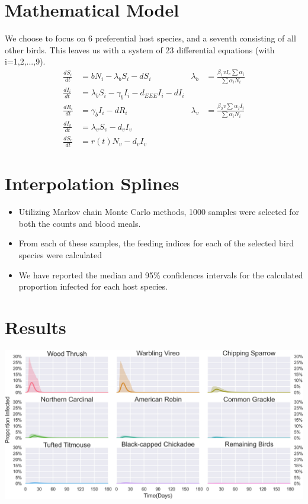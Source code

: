 \documentclass[portrait]{sciposter}
\begin{document}
\begin{multicols}{2}
 \section*{Mathematical Model}
We choose to focus on 6 preferential host species, and a seventh consisting of all other birds.  This leaves us with a system of 23 differential equations (with i=1,2,...,9). \\
\begin{align*}
\frac{dS_i}{dt} &= \textit{b}N_i - \lambda_bS_i - \textit{d}S_i&  
\lambda_b &= \frac{\beta_1vI_v\sum\alpha_i}{\sum\alpha_iN_i} \\
\frac{dI_i}{dt} &=  \lambda_bS_i -  \gamma_bI_i-d_{EEE}I_i - \textit{d}I_i \\
\frac{dR_i}{dt} &= \gamma_bI_i - \textit{d}R_i&
\lambda_v &= \frac{\beta_2v\sum\alpha_II_i}{\sum\alpha_iN_i} \\
\frac{dI_v}{dt} &= \lambda_vS_v - d_vI_v \\
\frac{dS_v}{dt} &= r(t)N_v - d_vI_v&
\end{align*}

\section*{Interpolation Splines}
\begin{itemize}
\item Utilizing Markov chain Monte Carlo methods, 1000 samples were selected for both the counts and blood meals.
\item From each of these samples, the feeding indices for each of the selected bird species were calculated
\item We have reported the median and 95\% confidences intervals for the calculated proportion infected for each host species. 
\end{itemize}

\section*{Results}
\includegraphics[width=\linewidth]{Results}


\end{multicols}
\end{document}
